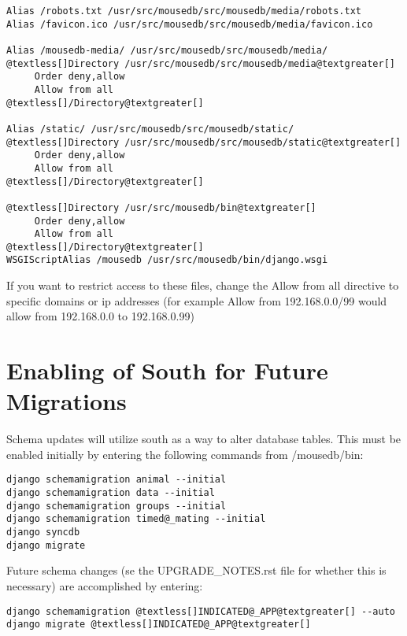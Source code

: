 \documentclass[letterpaper,10pt,english]{sphinxmanual}
\begin{document}
\begin{Verbatim}[commandchars=@\[\]]
Alias /robots.txt /usr/src/mousedb/src/mousedb/media/robots.txt
Alias /favicon.ico /usr/src/mousedb/src/mousedb/media/favicon.ico

Alias /mousedb-media/ /usr/src/mousedb/src/mousedb/media/
@textless[]Directory /usr/src/mousedb/src/mousedb/media@textgreater[]
     Order deny,allow
     Allow from all
@textless[]/Directory@textgreater[]

Alias /static/ /usr/src/mousedb/src/mousedb/static/
@textless[]Directory /usr/src/mousedb/src/mousedb/static@textgreater[]
     Order deny,allow
     Allow from all
@textless[]/Directory@textgreater[]

@textless[]Directory /usr/src/mousedb/bin@textgreater[]
     Order deny,allow
     Allow from all
@textless[]/Directory@textgreater[]
WSGIScriptAlias /mousedb /usr/src/mousedb/bin/django.wsgi
\end{Verbatim}

If you want to restrict access to these files, change the Allow from all directive to specific domains or ip addresses (for example Allow from 192.168.0.0/99 would allow from 192.168.0.0 to 192.168.0.99)


\section{Enabling of South for Future Migrations}
\label{installation:enabling-of-south-for-future-migrations}
Schema updates will utilize south as a way to alter database tables.  This must be enabled initially by entering the following commands from /mousedb/bin:

\begin{Verbatim}[commandchars=@\[\]]
django schemamigration animal --initial
django schemamigration data --initial
django schemamigration groups --initial
django schemamigration timed@_mating --initial
django syncdb
django migrate
\end{Verbatim}

Future schema changes (se the UPGRADE\_NOTES.rst file for whether this is necessary) are accomplished by entering:

\begin{Verbatim}[commandchars=@\[\]]
django schemamigration @textless[]INDICATED@_APP@textgreater[] --auto
django migrate @textless[]INDICATED@_APP@textgreater[]
\end{Verbatim}
\end{document}
